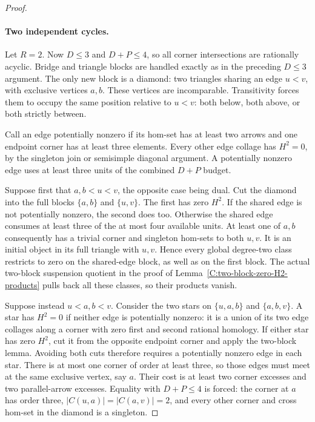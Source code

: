 \begin{proof}
\paragraph{Two independent cycles.}
Let $R=2$.  Now $D\leq3$ and $D+P\leq4$, so all
corner intersections are rationally acyclic.  Bridge
and triangle blocks are handled exactly as in the
preceding $D\leq3$ argument.  The only new block is
a diamond: two triangles sharing an edge $u<v$, with
exclusive vertices $a,b$.  These vertices are
incomparable.  Transitivity forces them to occupy the
same position relative to $u<v$: both below, both
above, or both strictly between.

Call an edge potentially nonzero if its hom-set has
at least two arrows and one endpoint corner has at
least three elements.  Every other edge collage has
$H^2=0$, by the singleton join or semisimple diagonal
argument.  A potentially nonzero edge uses at least
three units of the combined $D+P$ budget.

Suppose first that $a,b<u<v$, the opposite case being
dual.  Cut the diamond into the full blocks $\{a,b\}$
and $\{u,v\}$.  The first has zero $H^2$.  If the shared
edge is not potentially nonzero, the second does too.
Otherwise the shared edge consumes at least three of
the at most four available units.  At least one of
$a,b$ consequently has a trivial corner and singleton
hom-sets to both $u,v$.  It is an initial object in
its full triangle with $u,v$.  Hence every global
degree-two class restricts to zero on the shared-edge
block, as well as on the first block.  The actual
two-block suspension quotient in the proof of
Lemma~\ref{C:two-block-zero-H2-products} pulls back
all these classes, so their products vanish.

Suppose instead $u<a,b<v$.  Consider the two stars
on $\{u,a,b\}$ and $\{a,b,v\}$.  A star has $H^2=0$
if neither edge is potentially nonzero: it is a union
of its two edge collages along a corner with zero
first and second rational homology.  If either star
has zero $H^2$, cut it from the opposite endpoint
corner and apply the two-block lemma.
Avoiding both cuts therefore requires a potentially
nonzero edge in each star.  There is at most one
corner of order at least three, so those edges must
meet at the same exclusive vertex, say $a$.
Their cost is at least two corner excesses and two
parallel-arrow excesses.  Equality with $D+P\leq4$
is forced: the corner at $a$ has order three,
$|C(u,a)|=|C(a,v)|=2$, and every other corner and
cross hom-set in the diamond is a singleton.


\end{proof}
